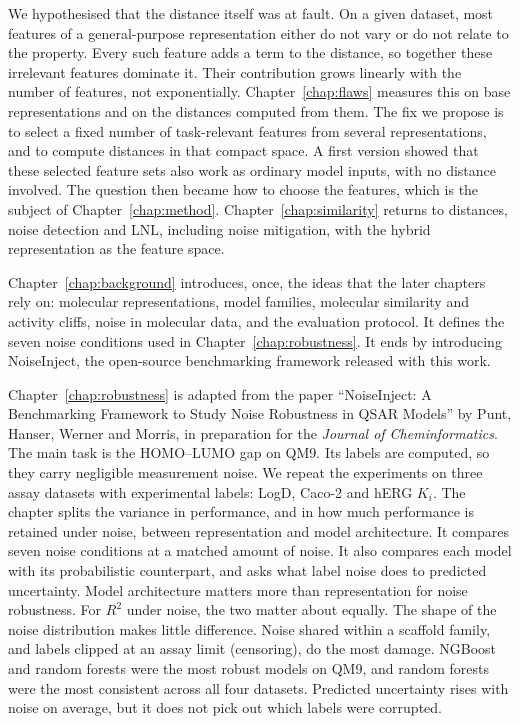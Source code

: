 We hypothesised that the distance itself was at fault. On a given dataset, most features of a general-purpose representation either do not vary or do not relate to the property. Every such feature adds a term to the distance, so together these irrelevant features dominate it. Their contribution grows linearly with the number of features, not exponentially. Chapter~\ref{chap:flaws} measures this on base representations and on the distances computed from them. The fix we propose is to select a fixed number of task-relevant features from several representations, and to compute distances in that compact space. A first version showed that these selected feature sets also work as ordinary model inputs, with no distance involved. The question then became how to choose the features, which is the subject of Chapter~\ref{chap:method}. Chapter~\ref{chap:similarity} returns to distances, noise detection and LNL, including noise mitigation, with the hybrid representation as the feature space.

Chapter~\ref{chap:background} introduces, once, the ideas that the later chapters rely on: molecular representations, model families, molecular similarity and activity cliffs, noise in molecular data, and the evaluation protocol. It defines the seven noise conditions used in Chapter~\ref{chap:robustness}. It ends by introducing NoiseInject, the open-source benchmarking framework released with this work.

Chapter~\ref{chap:robustness} is adapted from the paper ``NoiseInject: A Benchmarking Framework to Study Noise Robustness in QSAR Models'' by Punt, Hanser, Werner and Morris, in preparation for the \textit{Journal of Cheminformatics}. The main task is the HOMO--LUMO gap on QM9. Its labels are computed, so they carry negligible measurement noise. We repeat the experiments on three assay datasets with experimental labels: LogD, Caco-2 and hERG $K_i$. The chapter splits the variance in performance, and in how much performance is retained under noise, between representation and model architecture. It compares seven noise conditions at a matched amount of noise. It also compares each model with its probabilistic counterpart, and asks what label noise does to predicted uncertainty. Model architecture matters more than representation for noise robustness. For $R^2$ under noise, the two matter about equally. The shape of the noise distribution makes little difference. Noise shared within a scaffold family, and labels clipped at an assay limit (censoring), do the most damage. NGBoost and random forests were the most robust models on QM9, and random forests were the most consistent across all four datasets. Predicted uncertainty rises with noise on average, but it does not pick out which labels were corrupted.

